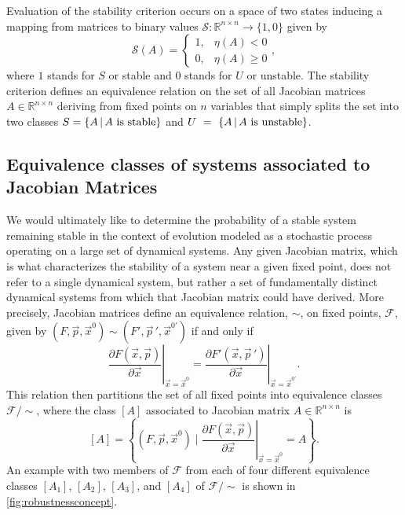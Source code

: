 Evaluation of the stability criterion occurs on a space of two states inducing a mapping from matrices to binary values $\mathcal{S} \colon \mathbb{R}^{n \times n} \rightarrow \{ 1, 0 \}$ given by
 \begin{equation}\label{eq:stabeval}
   \mathcal{S}(A) = \left\{
     \begin{array}{lr}
       1, & \eta (A) < 0\\
       0, & \eta (A) \geq 0
     \end{array},
   \right.
\end{equation}
where $1$ stands for $S$ or stable and $0$ stands for $U$ or unstable. The stability criterion defines an equivalence relation on the set of all Jacobian matrices $A \in \mathbb{R}^{n \times n}$ deriving from fixed points on $n$ variables that simply splits the set into two classes $S=\{ A \, | \, A \hbox{ is stable}  \}$ and $U~=~\{ A \, | \, A \hbox{ is unstable} \}$.

\subsection{Equivalence classes of systems associated to Jacobian Matrices}
We would ultimately like to determine the probability of a stable system remaining stable in the context of evolution modeled as a stochastic process operating on a large set of dynamical systems. Any given Jacobian matrix, which is what characterizes the stability of a system near a given fixed point, does not refer to a single dynamical system, but rather a set of fundamentally distinct dynamical systems from which that Jacobian matrix could have derived. More precisely, Jacobian matrices define an equivalence relation, $\sim$, on fixed points, $\mathcal{F}$, given by $(F,\vec{p},\vec{x}^0) \sim (F',\vec{p}\,',\vec{x}^{0'}) $ if and only if
\begin{equation}\label{eq:jaceqrel}
\left. \frac{\partial F(\vec{x},\vec{p})}{\partial \vec{x}} \right|_{\vec{x} = \vec{x}^0} =
\left. \frac{\partial F'(\vec{x},\vec{p}\,')}{\partial \vec{x}} \right|_{\vec{x} = \vec{x}^{0'}}.
\end{equation}
This relation then partitions the set of all fixed points into equivalence classes $\mathcal{F}/{\sim}$, where the class $[A]$ associated to Jacobian matrix $A \in \mathbb{R}^{n \times n}$ is
\begin{equation}\label{eq:jaceqs}
[A] = \left\{ (F,\vec{p},\vec{x}^0) \; \Bigg| \; \left. \frac{\partial F(\vec{x},\vec{p})}{\partial \vec{x}} \right|_{\vec{x} = \vec{x}^0} = A \right\}.
\end{equation}
An example with two members of $\mathcal{F}$ from each of four different equivalence classes $[A_1]$, $[A_2]$, $[A_3]$, and $[A_4]$ of $\mathcal{F}/{\sim}$ is shown in \ref{fig:robustnessconcept}.

